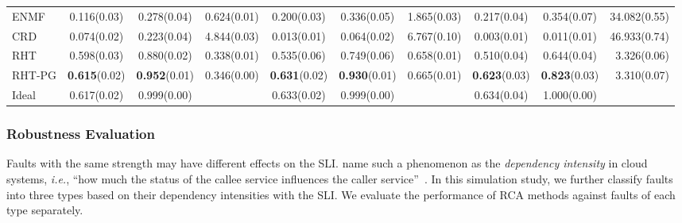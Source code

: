 \begin{table}[tb]
\begin{tabular}{l ccr ccr ccr}
		ENMF & 0.116(0.03) & 0.278(0.04) & 0.624(0.01) & 0.200(0.03) & 0.336(0.05) & 1.865(0.03) & 0.217(0.04) & 0.354(0.07) & 34.082(0.55) \\
		CRD & 0.074(0.02) & 0.223(0.04) & 4.844(0.03) & 0.013(0.01) & 0.064(0.02) & 6.767(0.10) & 0.003(0.01) & 0.011(0.01) & 46.933(0.74) \\
		RHT & 0.598(0.03) & 0.880(0.02) & 0.338(0.01) & 0.535(0.06) & 0.749(0.06) & 0.658(0.01) & 0.510(0.04) & 0.644(0.04) & 3.326(0.06) \\
		RHT-PG & \textbf{0.615}(0.02) & \textbf{0.952}(0.01) & 0.346(0.00) & \textbf{0.631}(0.02) & \textbf{0.930}(0.01) & 0.665(0.01) & \textbf{0.623}(0.03) & \textbf{0.823}(0.03) & 3.310(0.07) \\
		\midrule
        Ideal & 0.617(0.02) & 0.999(0.00) & & 0.633(0.02) & 0.999(0.00) & & 0.634(0.04) & 1.000(0.00) & \\ 
		\bottomrule
	\end{tabular}
\end{table}


\subsubsection{Robustness Evaluation}

Faults with the same strength may have different effects on the SLI.
\citeauthor{Yang:2021} name such a phenomenon as the \textit{dependency intensity} in cloud systems, \textit{i.e.}, ``how much the status of the callee service influences the caller service''~\cite{Yang:2021}.
In this simulation study, we further classify faults into three types based on their dependency intensities with the SLI.
We evaluate the performance of RCA methods against faults of each type separately.

